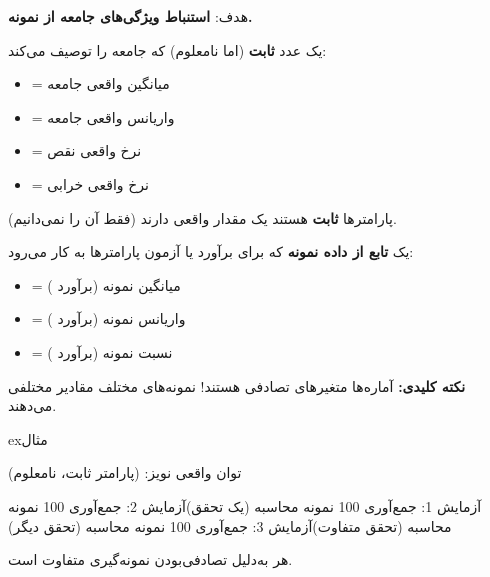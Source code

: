 هدف: \textbf{استنباط ویژگی‌های جامعه از نمونه.}



یک عدد \textbf{ثابت} (اما نامعلوم) که جامعه را توصیف می‌کند:

\begin{itemize}
\tightlist
\item
  \lr{$\mu$} = میانگین واقعی جامعه
\item
   = واریانس واقعی جامعه
\item
   = نرخ واقعی نقص
\item
  \lr{$\lambda$} = نرخ واقعی خرابی
\end{itemize}

پارامترها \textbf{ثابت} هستند  یک مقدار واقعی دارند (فقط آن را نمی‌دانیم).


یک \textbf{تابع از داده نمونه} که برای برآورد یا آزمون پارامترها به کار می‌رود:

\begin{itemize}
\tightlist
\item
   = میانگین نمونه (برآورد \lr{$\mu$})
\item
   = واریانس نمونه (برآورد )
\item
   = نسبت نمونه (برآورد )
\end{itemize}

\begin{PSquote}

\lr{\mbox{\PSwarn{}}} \textbf{نکته کلیدی:} آماره‌ها متغیرهای تصادفی هستند! نمونه‌های مختلف مقادیر مختلفی می‌دهند.

\end{PSquote}

\begin{PSbox}[unbreakable]{ex}{مثال}

توان واقعی نویز:  (پارامتر  ثابت، نامعلوم)

آزمایش 1: جمع‌آوری 100 نمونه \lr{\mbox{\ensuremath{\to}}} محاسبه  (یک تحقق)\PSbr{}آزمایش 2: جمع‌آوری 100 نمونه \lr{\mbox{\ensuremath{\to}}} محاسبه  (تحقق متفاوت)\PSbr{}آزمایش 3: جمع‌آوری 100 نمونه \lr{\mbox{\ensuremath{\to}}} محاسبه  (تحقق دیگر)

هر  به‌دلیل تصادفی‌بودن نمونه‌گیری متفاوت است.

\end{PSbox}

